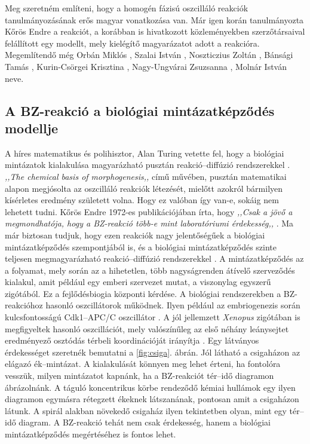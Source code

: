 Meg szeretném említeni, hogy a homogén fázisú oszcilláló reakciók tanulmányozásának erős magyar vonatkozása van. Már igen korán tanulmányozta Kőrös Endre a reakciót, a korábban is hivatkozott közleményekben \cite{field1974oscillations, noyes1972oscillations} szerzőtársaival felállított egy modellt, mely kielégítő magyarázatot adott a reakcióra. Megemlítendő még Orbán Miklós \cite{miklososzcillalo}, Szalai István \cite{molnar2015pattern}, Noszticzius Zoltán \cite{noszticzius1987sustained}, Bánsági Tamás \cite{bansagi2011tomography}, Kurin-Csörgei Krisztina \cite{orban2015ph}, Nagy-Ungvárai Zsuzsanna \cite{nagy1991control}, Molnár István \cite{molnar2015pattern} neve.

\subsection{A BZ-reakció a biológiai mintázatképződés modellje}

A híres matematikus és polihisztor, Alan Turing vetette fel, hogy a biológiai mintázatok kialakulása magyarázható pusztán reakció--diffúzió rendszerekkel \cite{turing1952chemical}. \emph{,,The chemical basis of morphogenesis,,} című művében, pusztán matematikai alapon megjósolta az oszcilláló reakciók létezését, mielőtt azokról bármilyen kísérletes eredmény született volna. Hogy ez valóban így van-e, sokáig nem lehetett tudni. Kőrös Endre 1972-es publikációjában írta, hogy \emph{,,Csak a jövő a megmondhatója, hogy a BZ-reakció több-e mint laboratóriumi érdekesség,,} \cite{field1972oscillations}. Ma már biztosan tudjuk, hogy ezen reakciók nagy jelentőségűek a biológiai mintázatképződés szempontjából is, és a biológiai mintázatképződés szinte teljesen megmagyarázható reakció--diffúzió rendszerekkel \cite{kondo2010reaction}. A mintázatképződés az a folyamat, mely során az a hihetetlen, több nagyságrenden átívelő szerveződés kialakul, amit például egy emberi szervezet mutat, a viszonylag egyszerű zigótából. Ez a fejlődésbiogia központi kérdése. A biológiai rendszerekben a BZ-reakcióhoz hasonló oszcillátorok működnek. Ilyen például az embriogenezis során kulcsfontosságú Cdk1--APC/C oszcillátor \cite{yang2013cdk1}. A jól jellemzett \emph{Xenopus} zigótában is megfigyeltek hasonló oszcillációt, mely valószínűleg az első néhány leánysejtet eredményező osztódás térbeli koordinációját irányítja \cite{chang2013mitotic}. Egy látványos érdekességet szeretnék bemutatni a \ref{fig:csiga}. ábrán. Jól látható a csigaházon az elágazó ék--mintázat. A kialakulását könnyen meg lehet érteni, ha fontolóra vesszük, milyen mintázatot kapnánk, ha a BZ-reakciót tér--idő diagramon ábrázolnánk. A táguló koncentrikus körbe rendeződő kémiai hullámok egy ilyen diagramon egymásra rétegzett ékeknek látszanának, pontosan amit a csigaházon látunk. A spirál alakban növekedő csigaház ilyen tekintetben olyan, mint egy tér--idő diagram. A BZ-reakció tehát nem csak érdekesség, hanem a biológiai mintázatképződés megértéséhez is fontos lehet.

